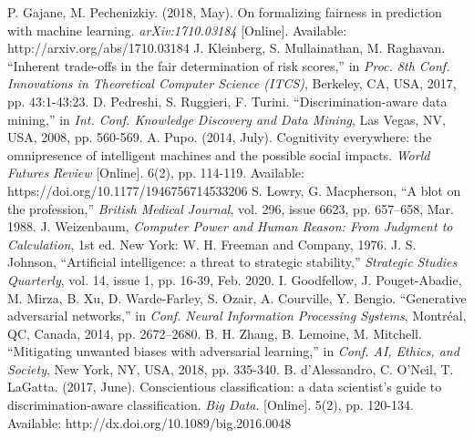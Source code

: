 \documentclass[a4paper]{IEEEtran}
\begin{document}


\newpage


\begin{thebibliography}{00}
 P. Gajane, M. Pechenizkiy. (2018, May). On formalizing fairness in prediction with machine learning. \textit{arXiv:1710.03184} [Online]. Available: http://arxiv.org/abs/1710.03184
 J. Kleinberg, S. Mullainathan, M. Raghavan. ``Inherent trade-offs in the fair determination of risk scores,'' in \textit{Proc. 8th Conf. Innovations in Theoretical Computer Science (ITCS)}, Berkeley, CA, USA, 2017, pp. 43:1-43:23.
 D. Pedreshi, S. Ruggieri, F. Turini. ``Discrimination-aware data mining,'' in \textit{Int. Conf. Knowledge Discovery and Data Mining}, Las Vegas, NV, USA, 2008, pp. 560-569. %
 A. Pupo. (2014, July). Cognitivity everywhere: the omnipresence of intelligent machines and the possible social impacts. \textit{World Futures Review} [Online]. 6(2), pp. 114-119. Available: https://doi.org/10.1177/1946756714533206
 S. Lowry, G. Macpherson, ``A blot on the profession,'' \textit{British Medical Journal}, vol. 296, issue 6623, pp. 657–658, Mar. 1988.  %
 J. Weizenbaum, \textit{Computer Power and Human Reason: From Judgment to Calculation}, 1st ed. New York: W. H. Freeman and Company, 1976.
 J. S. Johnson, ``Artificial intelligence: a threat to strategic stability,'' \textit{Strategic Studies Quarterly}, vol. 14, issue 1, pp. 16-39, Feb. 2020.
 I. Goodfellow, J. Pouget-Abadie, M. Mirza, B. Xu, D. Warde-Farley, S. Ozair, A. Courville, Y. Bengio. ``Generative adversarial networks,'' in \textit{Conf. Neural Information Processing Systems}, Montréal, QC, Canada, 2014, pp. 2672–2680.
 B. H. Zhang, B. Lemoine, M. Mitchell. ``Mitigating unwanted biases with adversarial learning,'' in \textit{Conf. AI, Ethics, and Society}, New York, NY, USA, 2018, pp. 335-340.
 B. d'Alessandro, C. O’Neil, T. LaGatta. (2017, June). Conscientious classification: a data scientist’s guide to discrimination-aware classification. \textit{Big Data}. [Online]. 5(2), pp. 120-134. Available: http://dx.doi.org/10.1089/big.2016.0048
\end{thebibliography}
\end{document}
